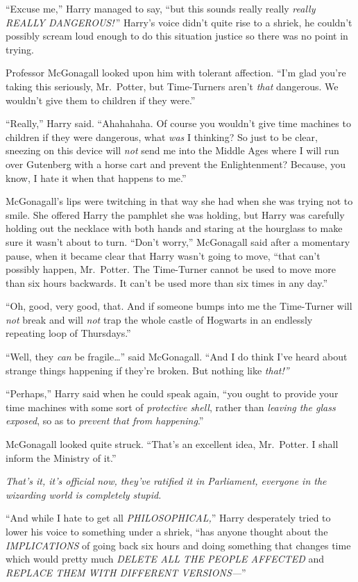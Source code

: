 ``Excuse me,'' Harry managed to say, ``but this sounds really really
\emph{really REALLY DANGEROUS!} '' Harry's voice didn't quite rise to a
shriek, he couldn't possibly scream loud enough to do this situation
justice so there was no point in trying.

Professor McGonagall looked upon him with tolerant affection. ``I'm glad
you're taking this seriously, Mr.~Potter, but Time-Turners aren't
\emph{that} dangerous. We wouldn't give them to children if they were.''

``Really,'' Harry said. ``Ahahahaha. Of course you wouldn't give time
machines to children if they were dangerous, what \emph{was} I thinking?
So just to be clear, sneezing on this device will \emph{not} send me
into the Middle Ages where I will run over Gutenberg with a horse cart
and prevent the Enlightenment? Because, you know, I hate it when that
happens to me.''

McGonagall's lips were twitching in that way she had when she was trying
not to smile. She offered Harry the pamphlet she was holding, but Harry
was carefully holding out the necklace with both hands and staring at
the hourglass to make sure it wasn't about to turn. ``Don't worry,''
McGonagall said after a momentary pause, when it became clear that Harry
wasn't going to move, ``that can't possibly happen, Mr.~Potter. The
Time-Turner cannot be used to move more than six hours backwards. It
can't be used more than six times in any day.''

``Oh, good, very good, that. And if someone bumps into me the
Time-Turner will \emph{not} break and will \emph{not} trap the whole
castle of Hogwarts in an endlessly repeating loop of Thursdays.''

``Well, they \emph{can} be fragile\ldots{}'' said McGonagall. ``And I do
think I've heard about strange things happening if they're broken. But
nothing like \emph{that!''}

``Perhaps,'' Harry said when he could speak again, ``you ought to
provide your time machines with some sort of \emph{protective shell},
rather than \emph{leaving the glass exposed}, so as to \emph{prevent
that from happening}.''

McGonagall looked quite struck. ``That's an excellent idea, Mr.~Potter.
I shall inform the Ministry of it.''

\emph{That's it, it's official now, they've ratified it in Parliament,
everyone in the wizarding world is completely stupid.}

``And while I hate to get all \emph{PHILOSOPHICAL,}'' Harry desperately
tried to lower his voice to something under a shriek, ``has anyone
thought about the \emph{IMPLICATIONS} of going back six hours and doing
something that changes time which would pretty much \emph{DELETE ALL THE
PEOPLE AFFECTED} and \emph{REPLACE THEM WITH DIFFERENT VERSIONS---}''

